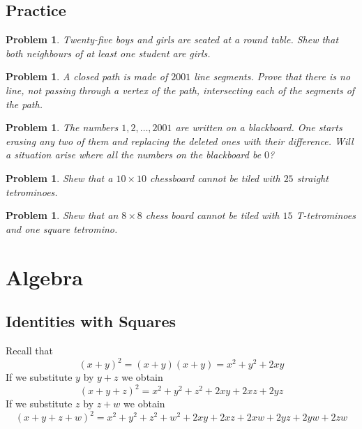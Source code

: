 \documentclass[11pt, openany]{book}
\theoremstyle{change} \theoremheaderfont{\blue\sffamily\bfseries}
\newtheorem{pro}[thm]{Problem}
\theoremstyle{nonumberplain} \theoremheaderfont{\sffamily\bfseries}
\newcommand{\í}{\'{\i}}
\begin{document}
\section*{Practice}\begin{multicols}{2}\columnseprule 1pt \columnsep 25pt
\begin{pro}
Twenty-five boys and girls are seated at a round table. Shew that
both neighbours of at least one student are girls.
\end{pro}
\begin{pro}
A closed path is made of $2001$ line segments. Prove that there is
no line, not passing through a vertex of the path, intersecting
each of the segments of the path.
\end{pro}
\begin{pro}
The numbers $1, 2, \ldots , 2001$ are written on a blackboard. One
starts erasing any two of them and replacing the deleted ones with
their difference. Will a situation arise where all the numbers on
the blackboard be $0$?
\end{pro}
\begin{pro}
Shew that a $10 \times 10$ chessboard cannot be tiled with $25$
straight tetrominoes.
\end{pro}
\begin{pro}
Shew that an $8\times 8$ chess board cannot be tiled with $15$
T-tetrominoes and one square tetromino.
\end{pro}
\end{multicols}
\chapter{Algebra}
\section{Identities with Squares} Recall that
\begin{equation}(x + y)^2 = (x + y)(x + y) = x^2 + y^2 + 2xy \end{equation} If we  substitute $y$ by $y + z$ we obtain
\begin{equation} (x + y + z)^2 = x^2 + y^2 + z^2 + 2xy + 2xz + 2yz \end{equation} If we substitute $z$ by $z + w$ we
obtain
\begin{equation}
(x + y + z + w)^2 = x^2 + y^2 + z^2 + w^2 + 2xy + 2xz + 2xw + 2yz
+ 2yw + 2zw \end{equation}
\end{document}
